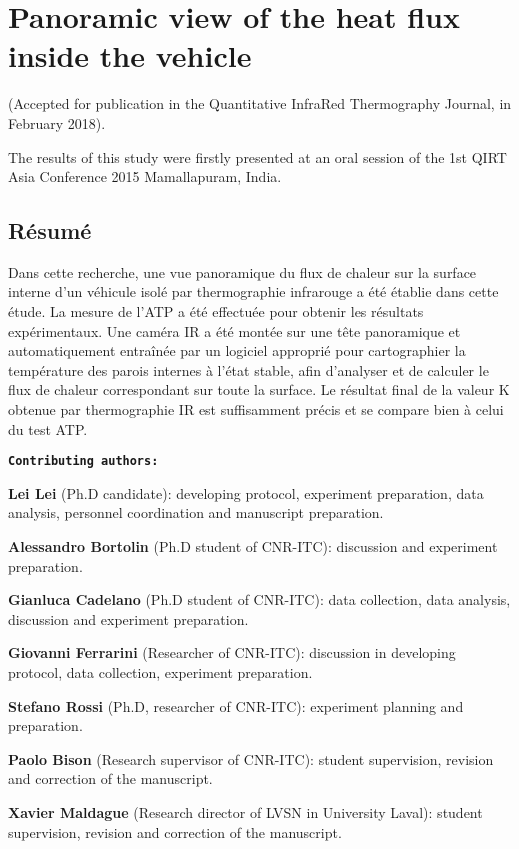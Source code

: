 \chapter{Panoramic view of the heat flux inside the vehicle}     %
(Accepted for publication in the Quantitative InfraRed Thermography Journal, in February 2018).

The results of this study were firstly presented at an oral session of the 1st QIRT Asia Conference 2015 Mamallapuram, India. %
\section*{Résumé}
Dans cette recherche, une vue panoramique du flux de chaleur sur la surface interne d'un véhicule isolé par thermographie infrarouge a été établie dans cette étude. La mesure de l'ATP a été effectuée pour obtenir les résultats expérimentaux. Une caméra IR a été montée sur une tête panoramique et automatiquement entraînée par un logiciel approprié pour cartographier la température des parois internes à l'état stable, afin d'analyser et de calculer le flux de chaleur correspondant sur toute la surface. Le résultat final de la valeur K obtenue par thermographie IR est suffisamment précis et se compare bien à celui du test ATP.

\textbf{\texttt{Contributing authors:}}

\textbf{\textsf{Lei Lei}} (Ph.D candidate): developing protocol, experiment preparation, data analysis,  personnel coordination and manuscript preparation.

\textbf{Alessandro Bortolin} (Ph.D student of CNR-ITC): discussion and experiment preparation.

\textbf{Gianluca Cadelano} (Ph.D student of CNR-ITC): data collection, data analysis, discussion and experiment preparation.

\textbf{Giovanni Ferrarini} (Researcher of CNR-ITC): discussion in developing protocol, data collection, experiment preparation.

\textbf{Stefano Rossi} (Ph.D, researcher of CNR-ITC): experiment planning and preparation.

\textbf{Paolo Bison} (Research supervisor of CNR-ITC): student supervision, revision and correction of the manuscript. 

\textbf{Xavier Maldague} (Research director of LVSN in University Laval): student supervision, revision and correction of the manuscript.


